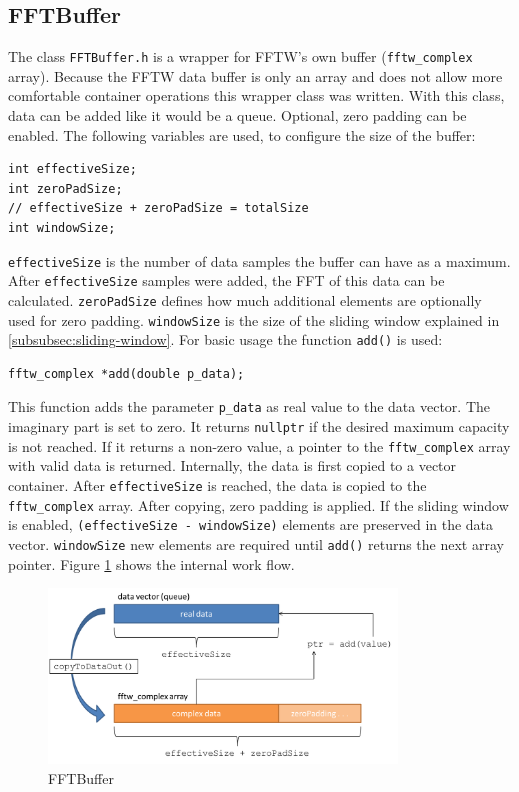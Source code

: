 \documentclass[notitlepage]{scrreprt}
\begin{document}
\subsection{FFTBuffer}
\label{subsec:fft-buffer}
The class \lstinline$FFTBuffer.h$ is a wrapper for FFTW's own buffer (\lstinline$fftw_complex$ array). Because the FFTW data buffer is only an array and does not allow more comfortable container operations this wrapper class was written. With this class, data can be added like it would be a queue. Optional, zero padding can be enabled. The following variables are used, to configure the size of the buffer:

\begin{lstlisting}
int effectiveSize;
int zeroPadSize;
// effectiveSize + zeroPadSize = totalSize
int windowSize;
\end{lstlisting}

\lstinline$effectiveSize$ is the number of data samples the buffer can have as a maximum. After \lstinline$effectiveSize$ samples were added, the FFT of this data can be calculated. \lstinline$zeroPadSize$ defines how much additional elements are optionally used for zero padding. \lstinline$windowSize$ is the size of the sliding window explained in \ref{subsubsec:sliding-window}. For basic usage the function \lstinline$add()$ is used:

\begin{lstlisting}
fftw_complex *add(double p_data);
\end{lstlisting}

This function adds the parameter \lstinline$p_data$ as real value to the data vector. The imaginary part is set to zero. It returns \lstinline$nullptr$ if the desired maximum capacity is not reached. If it returns a non-zero value, a pointer to the \lstinline$fftw_complex$ array with valid data is returned. Internally, the data is first copied to a vector container. After \lstinline$effectiveSize$ is reached, the data is copied to the \lstinline$fftw_complex$ array. After copying, zero padding is applied. If the sliding window is enabled, \lstinline$(effectiveSize - windowSize)$ elements are preserved in the data vector. \lstinline$windowSize$ new elements are required until \lstinline$add()$ returns the next array pointer. Figure \ref{fig:fft-buffer} shows the internal work flow.

\begin{figure}[H]
	\centering
	\includegraphics[width=350px]{images/FFTBuffer.png}
	\caption{FFTBuffer}
	\label{fig:fft-buffer}
\end{figure}
\end{document}
